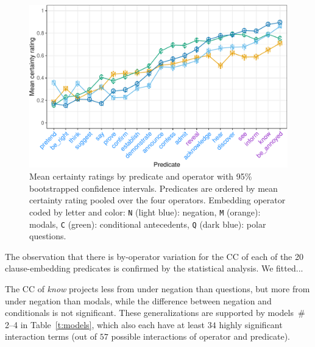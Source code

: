 \documentclass[a4paper,12pt,twoside]{article}
\begin{document}
\begin{figure}[ht]
				\centering
				\includegraphics[width = \linewidth]{predicate-operator-graph-1}
				\caption{Mean certainty ratings by predicate and operator with 95\% bootstrapped confidence intervals. Predicates are ordered by mean certainty rating pooled over the four operators.
Embedding operator coded by letter and color:  \texttt{N} (light blue): negation, \texttt{M} (orange): modals, \texttt{C} (green): conditional antecedents, \texttt{Q} (dark blue): polar questions.}
				\label{fig:op-pred-ratings}
			\end{figure}

The observation that there is by-operator variation for the CC of each of the 20 clause-embedding predicates is confirmed by the statistical analysis. We fitted...
    
  The CC of \emph{know} projects less from under negation than questions, but more from under negation than modals, while the difference between negation and conditionals is not significant.
			These generalizations are supported by models\ \# 2--4 in Table\ \ref{t:models}, which also each have at least $34$ highly significant interaction terms (out of $57$ possible interactions of operator and predicate).
\end{document}
